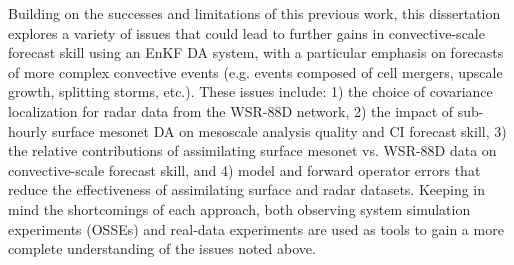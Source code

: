 Building on the successes and limitations of this previous work, this dissertation explores a variety of issues that could lead to further gains in convective-scale forecast skill using an EnKF DA system, with a particular emphasis on forecasts of more complex convective events (e.g. events composed of cell mergers, upscale growth, splitting storms, etc.). These issues include: 1) the choice of covariance localization for radar data from the WSR-88D network, 2) the impact of sub-hourly surface mesonet DA on mesoscale analysis quality and CI forecast skill, 3) the relative contributions of assimilating surface mesonet vs. WSR-88D data on convective-scale forecast skill, and 4) model and forward operator errors that reduce the effectiveness of assimilating surface and radar datasets. Keeping in mind the shortcomings of each approach, both observing system simulation experiments (OSSEs) and real-data experiments are used as tools to gain a more complete understanding of the issues noted above.
